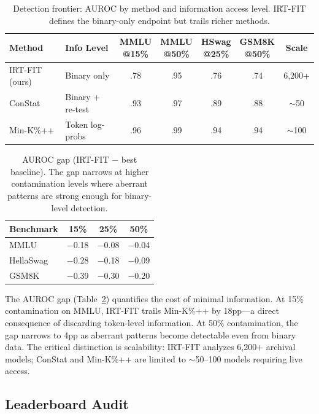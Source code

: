 \documentclass[11pt,a4paper]{article}
\begin{document}
\begin{table}[t]
\centering
\small
\caption{Detection frontier: AUROC by method and information access level. IRT-FIT defines the binary-only endpoint but trails richer methods.}
\label{tab:frontier}
\begin{tabular}{llccccc}
\toprule
Method & Info Level & \shortstack{MMLU\\@15\%} & \shortstack{MMLU\\@50\%} & \shortstack{HSwag\\@25\%} & \shortstack{GSM8K\\@50\%} & Scale \\
\midrule
IRT-FIT (ours) & Binary only & .78 & .95 & .76 & .74 & 6{,}200+ \\
ConStat & Binary + re-test & .93 & .97 & .89 & .88 & ${\sim}$50 \\
Min-K\%++ & Token log-probs & .96 & .99 & .94 & .94 & ${\sim}$100 \\
\bottomrule
\end{tabular}
\end{table}

\begin{table}[t]
\centering
\small
\caption{AUROC gap (IRT-FIT $-$ best baseline). The gap narrows at higher contamination levels where aberrant patterns are strong enough for binary-level detection.}
\label{tab:gap}
\begin{tabular}{lccc}
\toprule
Benchmark & 15\% & 25\% & 50\% \\
\midrule
MMLU & $-$0.18 & $-$0.08 & $-$0.04 \\
HellaSwag & $-$0.28 & $-$0.18 & $-$0.09 \\
GSM8K & $-$0.39 & $-$0.30 & $-$0.20 \\
\bottomrule
\end{tabular}
\end{table}

The AUROC gap (Table~\ref{tab:gap}) quantifies the cost of minimal information. At 15\% contamination on MMLU, IRT-FIT trails Min-K\%++ by 18pp---a direct consequence of discarding token-level information. At 50\% contamination, the gap narrows to 4pp as aberrant patterns become detectable even from binary data. The critical distinction is scalability: IRT-FIT analyzes 6{,}200+ archival models; ConStat and Min-K\%++ are limited to ${\sim}$50--100 models requiring live access.


\subsection{Leaderboard Audit}
\label{sec:audit}
\end{document}
